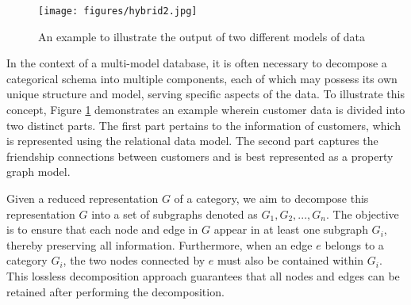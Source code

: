 \begin{figure}
\centering
\texttt{[image: figures/hybrid2.jpg]}
\caption{An example to illustrate the output of two different models of data} \label{fig:hybrid}
\end{figure}

 
 
 In the context of a multi-model database, it is often necessary to decompose a categorical schema into multiple components,  each of which may possess its own unique structure and model, serving specific aspects of the data. To illustrate this concept, Figure \ref{fig:hybrid} demonstrates an example wherein customer data is divided into two distinct parts. The first part pertains to the information of customers, which is represented using the relational data model. The second part captures the friendship connections between customers and is best represented as a property graph model.
 
 
 Given a reduced representation $G$ of a category, we aim to decompose this representation $G$ into a set of subgraphs denoted as ${G_1, G_2, ..., G_n}$. The objective is to ensure that each node and edge in $G$ appear in at least one subgraph $G_i$, thereby preserving all information. Furthermore, when an edge $e$ belongs to a category $G_i$, the two nodes connected by $e$ must also be contained within $G_i$. This lossless decomposition approach guarantees that all nodes and edges can be retained after performing the decomposition. 
 
 
 
 




